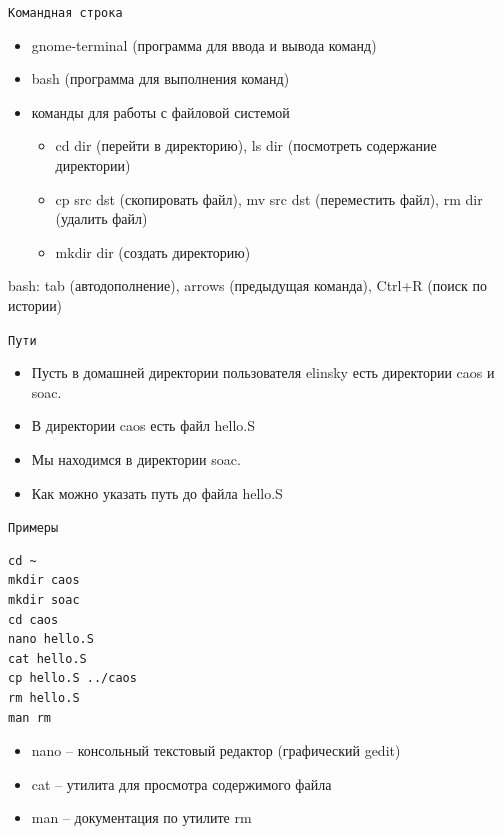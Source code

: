 \documentclass[pdf, 10pt, unicode]{beamer}
\begin{document}
\begin{frame}[fragile]{{\tt Командная строка }}
\begin{itemize}
  \item gnome-terminal (программа для ввода и вывода команд)
  \item bash (программа для выполнения команд)
  \item команды для работы с файловой системой
    \begin{itemize}
        \item cd dir (перейти в директорию), ls dir (посмотреть содержание директории)
        \item cp src dst (скопировать файл), mv src dst (переместить файл), rm dir (удалить файл)
        \item mkdir dir (создать директорию)
    \end{itemize}
\end{itemize}
bash: tab (автодополнение), arrows (предыдущая команда), Ctrl+R (поиск по истории)
\end{frame}

\begin{frame}[fragile]{{\tt Пути }}
\begin{itemize}
  \item Пусть в домашней директории пользователя elinsky есть директории caos и soac.
  \item В директории caos есть файл hello.S
  \item Мы находимся в директории soac.
  \item Как можно указать путь до файла hello.S
\end{itemize}

\begin{itemize}
\end{itemize}

\end{frame}

\begin{frame}[fragile]{{\tt Примеры }}

\begin{verbatim}
cd ~
mkdir caos
mkdir soac
cd caos
nano hello.S
cat hello.S
cp hello.S ../caos
rm hello.S
man rm
\end{verbatim}

\begin{itemize}
  \item nano -- консольный текстовый редактор (графический gedit)
  \item cat -- утилита для просмотра содержимого файла
  \item man -- документация по утилите rm
\end{itemize}

\end{frame}
\end{document}
